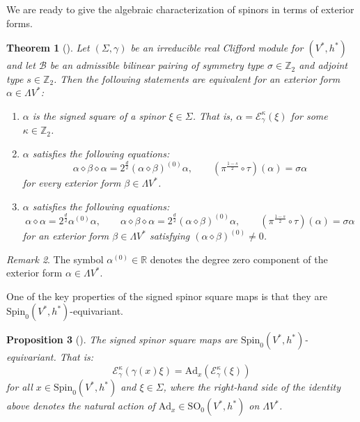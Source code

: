 \documentclass[10pt,reqno]{amsart}
\newtheorem{theorem}{Theorem}[section]
\newtheorem{proposition}[theorem]{Proposition}
\theoremstyle{definition}
\theoremstyle{remark}
\newtheorem{remark}[theorem]{Remark}
\newcommand{\Z}{\mathbb{Z}}
\newcommand{\R}{\mathbb{R}}
\begin{document}
We are ready to give the algebraic characterization of spinors in terms of exterior forms.

\begin{theorem}[{\cite[Thm.\ 3.20]{Cortes_Lazaroiu_Shahbazi2021}}]\label{thm:characterization_spinorial_forms}
    Let $(\Sigma,\gamma)$ be an irreducible real Clifford module for $(V^*,h^*)$ and let $\mathscr{B}$ be an admissible bilinear pairing of symmetry type $\sigma\in\Z_2$ and adjoint type $s\in\Z_2$. Then the following statements are equivalent for an exterior form $\alpha\in\Lambda V^*$: \begin{enumerate}
        \item $\alpha$ is the signed square of a spinor $\xi\in\Sigma$. That is, $\alpha=\mathcal{E}^\kappa_\gamma(\xi)$ for some $\kappa\in\Z_2$.
        \item $\alpha$ satisfies the following equations: $$\alpha\diamond\beta\diamond\alpha=2^{\frac{d}{2}}(\alpha\diamond\beta)^{(0)}\alpha,\qquad(\pi^{\frac{1-s}{2}}\circ\tau)(\alpha)=\sigma\alpha$$ for every exterior form $\beta\in\Lambda V^*$.
        \item $\alpha$ satisfies the following equations: $$\alpha\diamond\alpha=2^{\frac{d}{2}}\alpha^{(0)}\alpha,\qquad\alpha\diamond\beta\diamond\alpha=2^{\frac{d}{2}}(\alpha\diamond\beta)^{(0)}\alpha,\qquad(\pi^{\frac{1-s}{2}}\circ\tau)(\alpha)=\sigma\alpha$$ for an exterior form $\beta\in\Lambda V^*$ satisfying $(\alpha\diamond\beta)^{(0)}\neq0$.
    \end{enumerate}
\end{theorem}

\begin{remark}
    The symbol $\alpha^{(0)}\in\R$ denotes the degree zero component of the exterior form $\alpha\in\Lambda V^*$.
\end{remark}

One of the key properties of the signed spinor square maps is that they are $\mathrm{Spin}_0(V^*,h^*)$-equivariant.

\begin{proposition}[{\cite[Prop.\ 3.19]{Cortes_Lazaroiu_Shahbazi2021}}]\label{prop:equivariance_quadratic_map}
    The signed spinor square maps are $\mathrm{Spin}_0(V^*,h^*)$-equivariant. That is: $$\mathcal{E}^\kappa_\gamma(\gamma(x)\xi)=\mathrm{Ad}_x(\mathcal{E}^\kappa_\gamma(\xi))$$ for all $x\in\mathrm{Spin}_0(V^*,h^*)$ and $\xi\in\Sigma$, where the right-hand side of the identity above denotes the natural action of $\mathrm{Ad}_x\in\mathrm{SO}_0(V^*,h^*)$ on $\Lambda V^*$.
\end{proposition}
\end{document}
